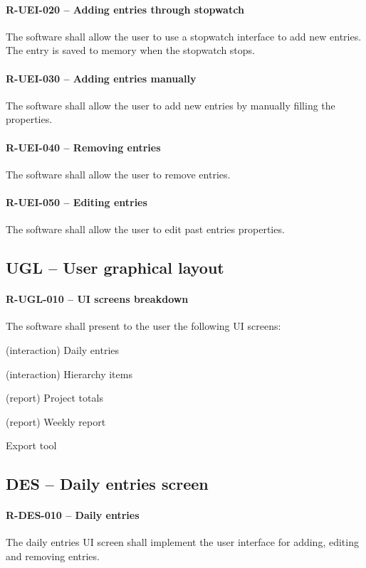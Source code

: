 \paragraph{R-UEI-020 -- Adding entries through stopwatch}
The software shall allow the user to use a stopwatch interface to
add new entries. The entry is saved to memory when the stopwatch stops.

\paragraph{R-UEI-030 -- Adding entries manually}
The software shall allow the user to add new entries by manually filling
the properties.

\paragraph{R-UEI-040 -- Removing entries}
The software shall allow the user to remove entries.

\paragraph{R-UEI-050 -- Editing entries}
The software shall allow the user to edit past entries properties.

\subsection{UGL -- User graphical layout}
\paragraph{R-UGL-010 -- \gls{UI} screens breakdown}
The software shall present to the user the following \gls{UI} screens:

\begin{compactitem}
\item (interaction) Daily entries
\item (interaction) Hierarchy items
\item (report) Project totals
\item (report) Weekly report
\item Export tool
\end{compactitem}

\subsection{DES -- Daily entries screen}
\paragraph{R-DES-010 -- Daily entries}
The daily entries \gls{UI} screen shall implement the user interface for adding,
editing and removing entries.

